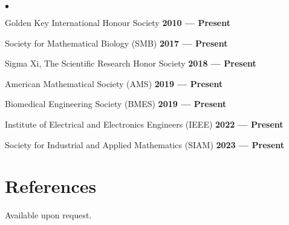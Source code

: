 \documentclass[margin,line]{res}
\newenvironment{list1}{
  \begin{list}{\ding{113}}{
      \setlength{\itemsep}{0in}
      \setlength{\parsep}{0in} \setlength{\parskip}{0in}
      \setlength{\topsep}{0in} \setlength{\partopsep}{0in}
      \setlength{\leftmargin}{0.17in}}}{\end{list}}
\newenvironment{list2}{
  \begin{list}{$\bullet$}{
      \setlength{\itemsep}{0in}
      \setlength{\parsep}{0in} \setlength{\parskip}{0in}
      \setlength{\topsep}{0in} \setlength{\partopsep}{0in}
      \setlength{\leftmargin}{0.2in}}}{\end{list}}
\begin{document}
\begin{resume}
\begin{list1}
  \begin{list2}
  \setlength\itemsep{0.5em}
  \item[] Golden Key International Honour Society \hfill {\bf \small 2010 --- Present}
  \item[] Society for Mathematical Biology (SMB) \hfill {\bf \small 2017 --- Present}
  \item[] Sigma Xi, The Scientific Research Honor Society \hfill {\bf \small 2018 --- Present}
  \item[] American Mathematical Society (AMS) \hfill {\bf \small 2019 --- Present}
  \item[] Biomedical Engineering Society (BMES) \hfill {\bf \small 2019 --- Present}
  \item[] Institute of Electrical and Electronics Engineers (IEEE) \hfill {\bf \small 2022 --- Present}
  \item[] Society for Industrial and Applied Mathematics (SIAM) \hfill {\bf \small 2023 --- Present}  
  \end{list2}
\end{list1}

\vspace*{.2cm}

\section{\sc References} Available upon request.




\end{resume}
\end{document}
